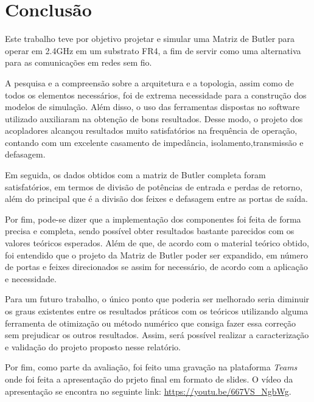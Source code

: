 \documentclass[
	12pt,				%
	oneside,			%
	a4paper,			%
	english,			%
	french,				%
	spanish,			%
	brazil,				%
	]{abntex2}
\begin{document}
\section{Conclusão}

Este trabalho teve por objetivo projetar e simular uma Matriz de Butler para operar em 2.4GHz em um substrato FR4, a fim de servir como uma alternativa para as comunicações em redes sem fio. 

A pesquisa e a compreensão sobre a arquitetura e a topologia, assim como de todos os elementos necessários, foi de extrema necessidade para a construção dos modelos de simulação. Além disso, o uso das ferramentas dispostas no software utilizado auxiliaram na obtenção de bons resultados. Desse modo, o projeto dos acopladores alcançou resultados muito satisfatórios na frequência de operação, contando com um excelente casamento de impedância, isolamento,transmissão e defasagem.

Em seguida, os dados obtidos com a matriz de Butler completa foram satisfatórios, em termos de divisão de potências de entrada e perdas de retorno, além do principal que é a divisão dos feixes e defasagem entre as portas de saída. 

Por fim, pode-se dizer que a implementação dos componentes foi feita de forma precisa e completa, sendo possível obter resultados bastante parecidos com os valores teóricos esperados. Além de que, de acordo com o material teórico obtido, foi entendido que o projeto da Matriz de Butler poder ser expandido, em número de portas e feixes direcionados se assim for necessário, de acordo com a aplicação e necessidade.

Para um futuro trabalho, o único ponto que poderia ser melhorado seria diminuir os graus existentes entre os resultados práticos com os teóricos utilizando alguma ferramenta de otimização ou método numérico que consiga fazer essa correção sem prejudicar os outros resultados. Assim, será possível realizar a caracterização e validação do projeto proposto nesse relatório.

Por fim, como parte da avaliação, foi feito uma gravação na plataforma \textit{Teams} onde foi feita a apresentação do prjeto final em formato de slides. O vídeo da apresentação se encontra no seguinte link: \url{https://youtu.be/667VS_NgbWg}.

\end{document}
